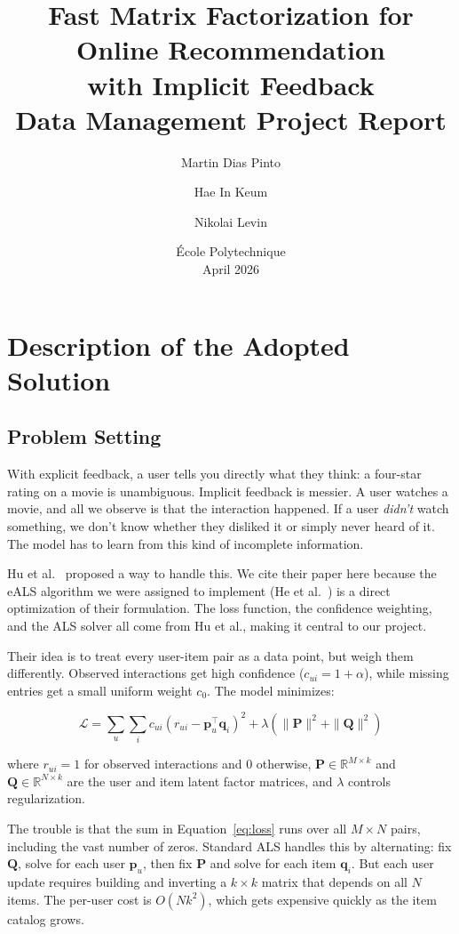 \documentclass[11pt,a4paper]{article}
\title{Fast Matrix Factorization for Online Recommendation\\with Implicit Feedback\\[0.5em]\large Data Management Project Report}
\author{Martin Dias Pinto \and Hae In Keum \and Nikolai Levin}
\date{\'Ecole Polytechnique\\[0.3em]April 2026}
\begin{document}
\maketitle

\section{Description of the Adopted Solution}

\subsection{Problem Setting}

With explicit feedback, a user tells you directly what they think: a four-star rating on a movie is unambiguous. Implicit feedback is messier. A user watches a movie, and all we observe is that the interaction happened. If a user \emph{didn't} watch something, we don't know whether they disliked it or simply never heard of it. The model has to learn from this kind of incomplete information.

Hu et al.~\cite{hu2008} proposed a way to handle this. We cite their paper here because the eALS algorithm we were assigned to implement (He et al.~\cite{he2016}) is a direct optimization of their formulation. The loss function, the confidence weighting, and the ALS solver all come from Hu et al., making it central to our project.

Their idea is to treat every user-item pair as a data point, but weigh them differently. Observed interactions get high confidence ($c_{ui} = 1 + \alpha$), while missing entries get a small uniform weight $c_0$. The model minimizes:

\begin{equation}
\mathcal{L} = \sum_{u}\sum_{i} c_{ui}\left(r_{ui} - \mathbf{p}_u^\top \mathbf{q}_i\right)^2 + \lambda\left(\|\mathbf{P}\|^2 + \|\mathbf{Q}\|^2\right)
\label{eq:loss}
\end{equation}

where $r_{ui} = 1$ for observed interactions and $0$ otherwise, $\mathbf{P} \in \mathbb{R}^{M \times k}$ and $\mathbf{Q} \in \mathbb{R}^{N \times k}$ are the user and item latent factor matrices, and $\lambda$ controls regularization.

The trouble is that the sum in Equation~\ref{eq:loss} runs over all $M \times N$ pairs, including the vast number of zeros. Standard ALS handles this by alternating: fix $\mathbf{Q}$, solve for each user $\mathbf{p}_u$, then fix $\mathbf{P}$ and solve for each item $\mathbf{q}_i$. But each user update requires building and inverting a $k \times k$ matrix that depends on all $N$ items. The per-user cost is $O(Nk^2)$, which gets expensive quickly as the item catalog grows.
\end{document}
